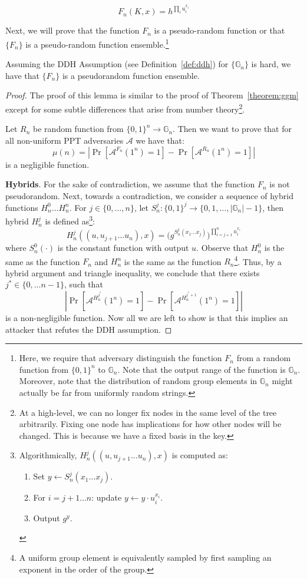 \[F_n(K,x) = h^{\prod_{i} u_i^{x_i}}\]

Next, we will prove that the function $F_n$ is a pseudo-random function or that $\{F_n\}$ is a pseudo-random function ensemble.\footnote{Here, we require that adversary distinguish the function $F_n$ from a random function from $\{0,1\}^n$ to $\mathbb{G}_n$. Note that the output range of the function is $\mathbb{G}_n$. Moreover, note that the distribution of random group elements in $\mathbb{G}_n$ might actually be far from uniformly random strings.}
\begin{lemma}
    Assuming the DDH Assumption (see Definition~\ref{def:ddh}) for $\{\mathbb{G}_n\}$ is hard, we have that $\{F_n\}$ is a pseudorandom function ensemble.
\end{lemma}
\begin{proof}
    The proof of this lemma is similar to the proof of Theorem~\ref{theorem:ggm} except for some subtle differences that arise from number theory\footnote{At a high-level, we can no longer fix nodes in the same level of the tree arbitrarily. Fixing one node has implications for how other nodes will be changed. This is because we have a fixed basis in the key.}.

    Let $R_n$ be random function from $\{0,1\}^n \rightarrow \mathbb{G}_n$. Then we want to prove that for all non-uniform PPT adversaries $\mathcal{A}$ we have that:
    \[\mu(n) = \left|\Pr[\mathcal{A}^{F_n}(1^n) =1] -  \Pr[\mathcal{A}^{R_n}(1^n) =1]\right|\]
    is a negligible function. \smallskip

    \noindent \textbf{Hybrids}. For the sake of contradiction, we assume that the function $F_n$ is not pseudorandom. Next, towards a contradiction, we consider a sequence of hybrid functions $H^0_n \ldots H^n_n$.
    For $j \in \{0, \dots, n\}$, let $S^j_n: \{0, 1\}^j \to \{0, 1, \dots, |\mathbb{G}_n|-1\}$, then hybrid $H_n^j$ is defined as\footnote{Algorithmically, $H_n^j((u,u_{j+1}\ldots u_n),x)$ is computed as:
    \begin{enumerate}
        \item Set $y \gets S_n^j(x_1\ldots x_j)$.
        \item For $i = j+1 \dots n$: update $y \gets y \cdot u_i^{x_i}$.
        \item Output $g^y$.
    \end{enumerate}

    }:
    \begin{equation*}
        H_n^j((u,u_{j+1}\ldots u_n),x) = \big(g^{S_n^j(x_1\ldots x_j)}\big)^{\prod_{i=j+1}^n u_i^{x_i}}
    \end{equation*}
    where $S_n^0(\cdot)$ is the constant function with output $u$. Observe that $H_n^0$ is the same as the function $F_n$ and $H_n^n$ is the same as the function $R_n$\footnote{A uniform group element is equivalently sampled by first sampling an exponent in the order of the group.}. Thus, by a hybrid argument and triangle inequality, we conclude that there exists $j^* \in \{0,\ldots n-1\}$, such that
    \[\left|\Pr[\mathcal{A}^{H_n^{j^*}}(1^n) =1] -  \Pr[\mathcal{A}^{H_n^{j^*+1}}(1^n) =1]\right|\]
    is a non-negligible function. Now all we are left to show is that this implies an attacker that refutes the DDH assumption.\smallskip


\end{proof}
